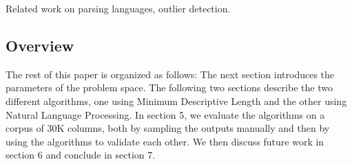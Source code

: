 Related work on parsing languages, outlier detection.

\subsection{Overview}
The rest of this paper is organized as follows: The next section introduces the parameters of the problem space. The following two sections describe the two different algorithms, one using Minimum Descriptive Length and the other using Natural Language Processing. In section 5, we evaluate the algorithms on a corpus of 30K columns, both by sampling the outputs manually and then by using the algorithms to validate each other. We then discuss future work in section 6 and conclude in section 7.
